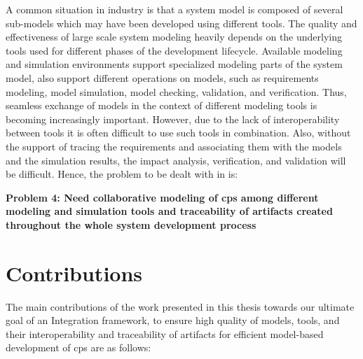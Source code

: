 A common situation in industry is that a system model is composed of several sub-models which may have been developed using different tools. The quality and effectiveness of large scale system modeling heavily depends on the underlying tools used for different phases of the development lifecycle. Available modeling and simulation environments support specialized modeling parts of the system model, also support different operations on models, such as requirements modeling, model simulation, model checking, validation, and verification. Thus, seamless exchange of models in the context of different modeling tools is becoming increasingly important. However, due to the lack of interoperability between tools it is often difficult to use such tools in combination. Also, without the support of tracing the requirements and associating them with the models and the simulation results, the impact analysis, verification, and validation will be difficult. Hence, the problem to be dealt with in is:

\begin{description}

\item \textbf{Problem 4: Need collaborative modeling of \acrshort{cps} among different modeling and simulation tools and traceability of artifacts created throughout the whole system development process}

\end{description}

\section{Contributions}
\label{sec:Contributions}


The main contributions of the work presented in this thesis towards our ultimate goal of an Integration framework, to ensure high quality of models, tools, and their interoperability and traceability of artifacts for efficient model-based development of \acrshort{cps} are as follows:

